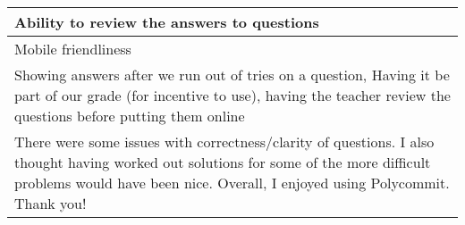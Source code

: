 \begin{longtable}{|p{1\linewidth}|}
		\hline
		Ability to review the answers to questions                                                                                                                                                                                                                                                                                                                                                                                                                                                                                                                                                                                                                                                       \\
		\hline
		Mobile friendliness                                                                                                                                                                                                                                                                                                                                                                                                                                                                                                                                                                                                                                                                              \\
		\hline
		Showing answers after we run out of tries on a question, Having it be part of our grade (for incentive to use), having the teacher review the questions before putting them online                                                                                                                                                                                                                                                                                                                                                                                                                                                                                                               \\
		\hline
		There were some issues with correctness/clarity of questions. I also thought having worked out solutions for some of the more difficult problems would have been nice. Overall, I enjoyed using Polycommit. Thank you!                                                                                                                                                                                                                                                                                                                                                                                                                                                                           \\

\end{longtable}
